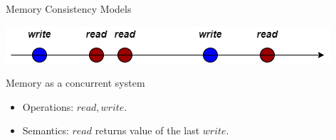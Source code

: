 \begin{frame}{Memory Consistency Models}
    \begin{center}
        \includegraphics[scale=.5]{resources/memory_model_naive.png}
    \end{center}
    \begin{block}{Memory as a concurrent system}
        \begin{itemize}
            \item \alert{Operations}: $read, write$.
            \pause
            \item \alert{Semantics}: $read$ returns value of the last $write$.
        \end{itemize}    
    \end{block}
\end{frame}

